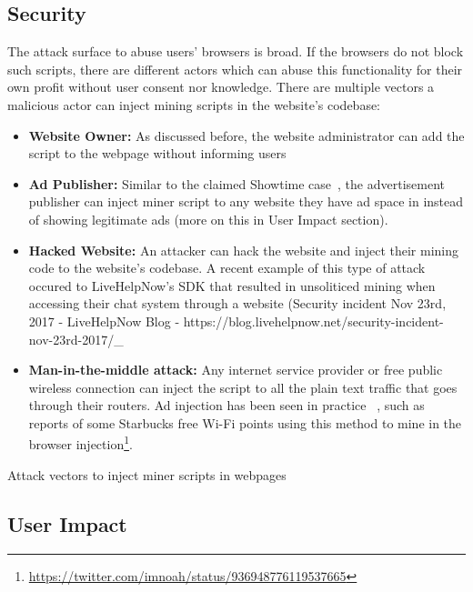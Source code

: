 \subsection{Security}
The attack surface to abuse users' browsers is broad. If the browsers do not block such scripts, there are different actors which can abuse this functionality for their own profit without user consent nor knowledge. There are multiple vectors a malicious actor can inject mining scripts in the website's codebase:
\begin{itemize}
\item \textbf{Website Owner:} As discussed before, the website administrator can add the script to the webpage without informing users
\item \textbf{Ad Publisher:} Similar to the claimed Showtime case~\cite{showtimehive}, the advertisement publisher can inject miner script to any website they have ad space in instead of showing legitimate ads (more on this in User Impact section).
\item \textbf{Hacked Website:} An attacker can hack the website and inject their mining code to the website's codebase. A recent example of this type of attack occured to LiveHelpNow's SDK that resulted in unsoliticed mining when accessing their chat system through a website (Security incident Nov 23rd, 2017 - LiveHelpNow Blog - https://blog.livehelpnow.net/security-incident-nov-23rd-2017/_
\item \textbf{Man-in-the-middle attack:} Any internet service provider or free public wireless connection can inject the script to all the plain text traffic that goes through their routers. Ad injection has been seen in practice ~\cite{vergeadinjection}, such as reports of some Starbucks free Wi-Fi points using this method to mine in the browser injection\footnote{\url{https://twitter.com/imnoah/status/936948776119537665}}.
\end{itemize}

\begin{center}
	\caption{Attack vectors to inject miner scripts in webpages}
\end{center}

\subsection{User Impact}

